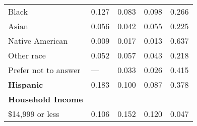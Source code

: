 {\begin{tabular}{L{5.5cm} C{3.5cm} C{3.5cm} C{3.5cm} C{4cm}}
                          Black                           &                          0.127                           &                          0.083                           &                          0.098                           &                          0.266                            \\
                          Asian                           &                          0.056                           &                          0.042                           &                          0.055                           &                          0.225                            \\
                     Native American                      &                          0.009                           &                          0.017                           &                          0.013                           &                          0.637                            \\
                        Other race                        &                          0.052                           &                          0.057                           &                          0.043                           &                          0.218                            \\
                   Prefer not to answer                   &                           ---                            &                          0.033                           &                          0.026                           &                          0.415                            \\
\textbf{Hispanic}                                         &                          0.183                           &                          0.100                           &                          0.087                           &                          0.378                            \\
\textbf{Household Income}                                 &                                                          &                                                          &                                                          &                                                           \\
                     \$14,999 or less                     &                          0.106                           &                          0.152                           &                          0.120                           &                          0.047                            \\

\end{tabular}}
